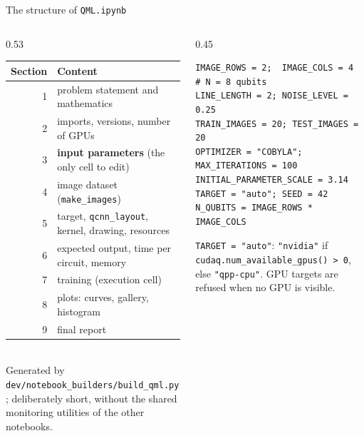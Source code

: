 \documentclass[aspectratio=169,11pt]{beamer}
\newcommand{\key}[1]{{\color{qdark}\textbf{#1}}}
\begin{document}
\begin{frame}[fragile,label=fStruct]{The structure of \texttt{QML.ipynb}}
  \begin{columns}[T]
    \begin{column}{0.53\textwidth}
      \scriptsize
      \begin{tabular}{rl}
        \toprule \textbf{Section} & \textbf{Content}\\ \midrule
        1 & problem statement and mathematics\\
        2 & imports, versions, number of GPUs\\
        3 & \key{input parameters} (the only cell to edit)\\
        4 & image dataset (\texttt{make\_images})\\
        5 & target, \texttt{qcnn\_layout}, kernel, drawing, resources\\
        6 & expected output, time per circuit, memory\\
        7 & training (execution cell)\\
        8 & plots: curves, gallery, histogram\\
        9 & final report\\ \bottomrule
      \end{tabular}\\[3pt]
      \scriptsize Generated by \texttt{dev/notebook\_builders/build\_qml.py}; deliberately short, without the shared monitoring utilities of the other notebooks.
    \end{column}
    \begin{column}{0.45\textwidth}
\begin{lstlisting}[basicstyle=\ttfamily\tiny]
IMAGE_ROWS = 2;  IMAGE_COLS = 4   # N = 8 qubits
LINE_LENGTH = 2; NOISE_LEVEL = 0.25
TRAIN_IMAGES = 20; TEST_IMAGES = 20
OPTIMIZER = "COBYLA"; MAX_ITERATIONS = 100
INITIAL_PARAMETER_SCALE = 3.14
TARGET = "auto"; SEED = 42
N_QUBITS = IMAGE_ROWS * IMAGE_COLS
\end{lstlisting}
      \scriptsize \texttt{TARGET = "auto"}: \texttt{"nvidia"} if \texttt{cudaq.num\_available\_gpus() > 0}, else \texttt{"qpp-cpu"}.
      GPU targets are refused when no GPU is visible.
    \end{column}
  \end{columns}
\end{frame}
\end{document}
